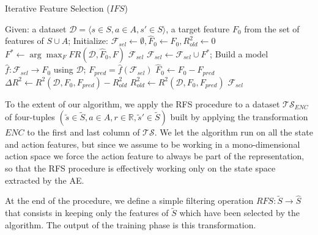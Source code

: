 \begin{algorithm}[h]
    \caption{Iterative Feature Selection ($IFS$)}
    \label{alg:IFS}
    \begin{algorithmic}
	\STATE Given: a dataset $\mathcal{D} = {\langle s \in S, a \in A, s' \in S \rangle}$, a target feature $F_0$ from the set of features of $S \cup A$;
	\STATE Initialize: $\mathcal{F}_{sel} \leftarrow \emptyset, \hat{F}_0 \leftarrow F_0, R^2_{old} \leftarrow 0$
	\REPEAT
	    \STATE $F^* \leftarrow \arg\max_F FR(\mathcal{D}, \hat{F}_0, F)$
		\RETURN $\mathcal{F}_{sel}$
	    \ENDIF
	    \STATE $\mathcal{F}_{sel} \leftarrow \mathcal{F}_{sel} \cup F^*$;
	    \STATE Build a model $\hat{f}: \mathcal{F}_{sel} \rightarrow F_0$ using $\mathcal{D}$;
	    \STATE $F_{pred} = \hat{f}(\mathcal{F}_{sel})$
	    \STATE $\hat{F}_0 \leftarrow F_0 - F_{pred}$
	    \STATE $\Delta R^2 \leftarrow R^2(\mathcal{D}, F_0, F_{pred}) - R^2_{old}$
	    \STATE $R^2_{old} \leftarrow R^2 (\mathcal{D}, F_0, F_{pred})$
	\RETURN $\mathcal{F}_{sel}$	
    \end{algorithmic}
\end{algorithm}
%

To the extent of our algorithm, we apply the RFS procedure to a dataset 
$\mathcal{TS}_{ENC}$ of four-tuples 
$(\tilde{s} \in \tilde{S}, a \in A, r \in \mathbb{R}, \tilde{s}' \in \tilde{S})$
built by applying the transformation $ENC$ to the first and last column of 
$\mathcal{TS}$.
We let the algorithm run on all the state and action features, but since we 
assume to be working in a mono-dimensional action space we force the action 
feature to always be part of the representation, so that the RFS procedure is 
effectively working only on the state space extracted by the AE.

At the end of the procedure, we define a simple filtering operation 
$RFS: \tilde{S} \rightarrow \hat{S}$ that consists in keeping only the features
of $\tilde{S}$ which have been selected by the algorithm. The output of the 
training phase is this transformation. 


